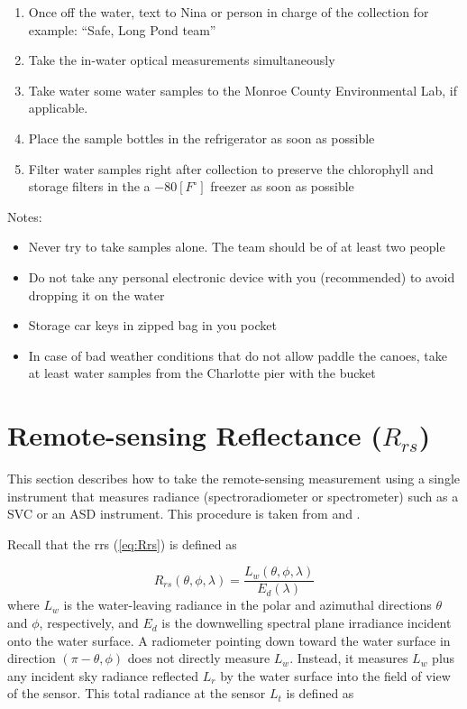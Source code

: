 \begin{appendices}
\begin{enumerate}[itemsep=2pt,parsep=2pt]
  \item Once off the water, text to Nina or person in charge of the collection for example: ``Safe, Long Pond team''
  \item Take the in-water optical measurements simultaneously
  \item Take water some water samples to the Monroe County Environmental Lab, if applicable.
  \item Place the sample bottles in the refrigerator as soon as possible
  \item Filter water samples right after collection to preserve the chlorophyll and storage filters in the a $-80[F^\circ]$ freezer as soon as possible
\end{enumerate}
Notes: 
\begin{itemize}[itemsep=2pt,parsep=2pt]
  \item Never try to take samples alone. The team should be of at least two people
  \item Do not take any personal electronic device with you (recommended) to avoid dropping it on the water
  \item Storage car keys in zipped bag in you pocket
  \item In case of bad weather conditions that do not allow paddle the canoes, take at least water samples from the Charlotte pier with the bucket
\end{itemize}

\section{Remote-sensing Reflectance (\texorpdfstring{$R_{rs}$}{Rrs})}


This section describes how to take the remote-sensing measurement using a single instrument that measures radiance (spectroradiometer or spectrometer) such as a SVC \citep{SVCHR1024i} or an ASD \citep{ASDManual2012} instrument. This procedure is taken from \citet{Mobley:1999} and \citet{Mueller1995}. 

Recall that the \gls{rrs} (\autoref{eq:Rrs}) is defined as

\begin{equation}\label{eq:RrsAppendix}
	R_{rs}(\theta,\phi,\lambda)=\frac{L_w(\theta,\phi,\lambda)}{E_d(\lambda)}
\end{equation}
where $L_w$ is the water-leaving radiance in the polar and azimuthal directions $\theta$ and $\phi$, respectively, and $E_d$ is the downwelling spectral plane irradiance incident onto the water surface. A radiometer pointing down toward the water surface in direction $(\pi-\theta,\phi)$ does not directly measure $L_w$. Instead, it measures $L_w$  plus any incident sky radiance reflected $L_r$ by the water surface into the field of view of the sensor. This total radiance at the sensor $L_t$ is defined as


\end{appendices}
